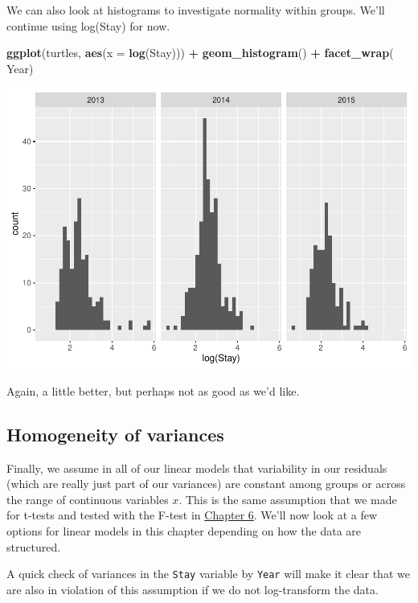 \documentclass[
]{book}
\newenvironment{Shaded}{\begin{snugshade}}{\end{snugshade}}
\newcommand{\DataTypeTok}[1]{\textcolor[rgb]{0.13,0.29,0.53}{#1}}
\newcommand{\KeywordTok}[1]{\textcolor[rgb]{0.13,0.29,0.53}{\textbf{#1}}}
\newcommand{\NormalTok}[1]{#1}
\newcommand{\OperatorTok}[1]{\textcolor[rgb]{0.81,0.36,0.00}{\textbf{#1}}}
\newcommand{\StringTok}[1]{\textcolor[rgb]{0.31,0.60,0.02}{#1}}
\begin{document}
We can also look at histograms to investigate normality within groups. We'll continue using log(Stay) for now.

\begin{Shaded}
\begin{Highlighting}[]
\KeywordTok{ggplot}\NormalTok{(turtles, }\KeywordTok{aes}\NormalTok{(}\DataTypeTok{x =} \KeywordTok{log}\NormalTok{(Stay))) }\OperatorTok{+}
\StringTok{  }\KeywordTok{geom_histogram}\NormalTok{() }\OperatorTok{+}
\StringTok{  }\KeywordTok{facet_wrap}\NormalTok{(}\OperatorTok{~}\StringTok{ }\NormalTok{Year)}
\end{Highlighting}
\end{Shaded}

\includegraphics{worstr_files/figure-latex/unnamed-chunk-231-1.pdf}

Again, a little better, but perhaps not as good as we'd like.

\hypertarget{homogeneity-of-variances}{%
\subsection{Homogeneity of variances}\label{homogeneity-of-variances}}

Finally, we assume in all of our linear models that variability in our residuals (which are really just part of our variances) are constant among groups or across the range of continuous variables \(x\). This is the same assumption that we made for t-tests and tested with the F-test in \protect\hyperlink{Chapter6}{Chapter 6}. We'll now look at a few options for linear models in this chapter depending on how the data are structured.

A quick check of variances in the \texttt{Stay} variable by \texttt{Year} will make it clear that we are also in violation of this assumption if we do not log-transform the data.
\end{document}
